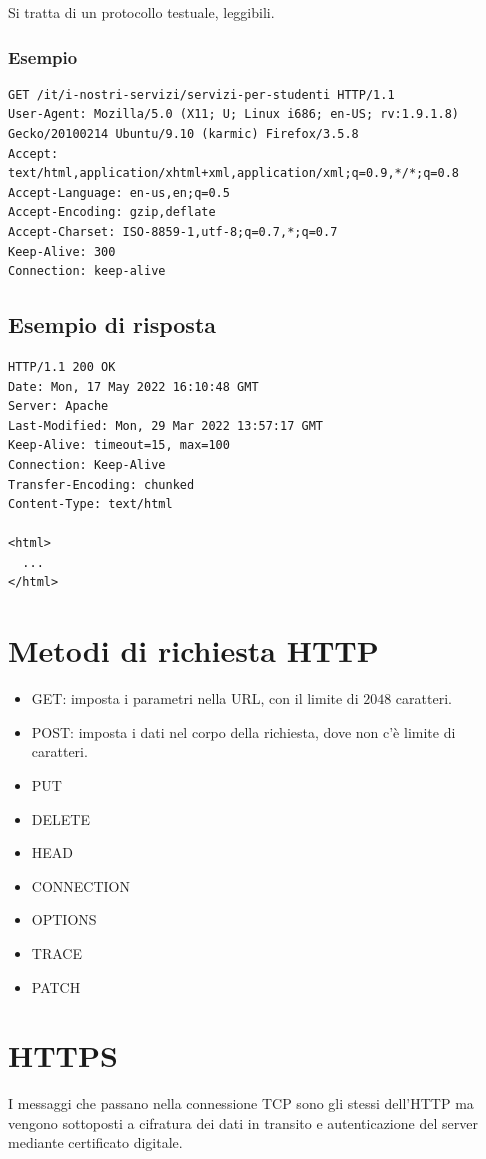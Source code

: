 \documentclass[oneside,a4paper,11pt]{book}
\theoremstyle{italicstyle}
\theoremstyle{normStyle}
\begin{document}
Si tratta di un protocollo testuale, leggibili.

\subsubsection{Esempio}
\begin{lstlisting}[basicstyle=\small]
GET /it/i-nostri-servizi/servizi-per-studenti HTTP/1.1
User-Agent: Mozilla/5.0 (X11; U; Linux i686; en-US; rv:1.9.1.8)
Gecko/20100214 Ubuntu/9.10 (karmic) Firefox/3.5.8
Accept: text/html,application/xhtml+xml,application/xml;q=0.9,*/*;q=0.8
Accept-Language: en-us,en;q=0.5
Accept-Encoding: gzip,deflate
Accept-Charset: ISO-8859-1,utf-8;q=0.7,*;q=0.7
Keep-Alive: 300
Connection: keep-alive
\end{lstlisting}
\subsection{Esempio di risposta}
\begin{lstlisting}[basicstyle=\small]
HTTP/1.1 200 OK
Date: Mon, 17 May 2022 16:10:48 GMT
Server: Apache
Last-Modified: Mon, 29 Mar 2022 13:57:17 GMT
Keep-Alive: timeout=15, max=100
Connection: Keep-Alive
Transfer-Encoding: chunked
Content-Type: text/html

<html> 
  ... 
</html>
\end{lstlisting}
\section{Metodi di richiesta HTTP}
\begin{itemize}
  \item GET: imposta i parametri nella URL, con il limite di $2048$ caratteri.
  \item POST: imposta i dati nel corpo della richiesta, dove non c'è limite di 
  caratteri.
  \item PUT 
  \item DELETE 
  \item HEAD 
  \item CONNECTION 
  \item OPTIONS 
  \item TRACE 
  \item PATCH 
\end{itemize}
\section{HTTPS}
I messaggi che passano nella connessione TCP sono gli stessi dell'HTTP ma vengono 
sottoposti a cifratura dei dati in transito e autenticazione del server mediante 
certificato digitale.
\end{document}
